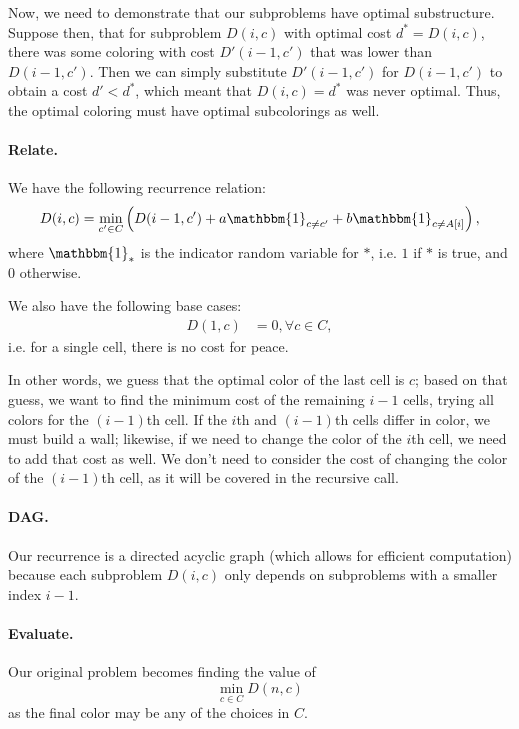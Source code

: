 \documentclass{6046}
\begin{document}
Now, we need to demonstrate that our subproblems
have optimal substructure. Suppose then, that
for subproblem $D(i, c)$ with optimal cost
$d^* = D(i, c)$, there was some coloring
with cost $D'(i - 1, c')$ that was lower than
$D(i - 1, c')$. Then we can simply substitute
$D'(i - 1, c')$ for $D(i - 1, c')$ to obtain
a cost $d' < d^*$, which meant that
$D(i, c) = d^*$ was never optimal. Thus,
the optimal coloring must have optimal subcolorings
as well.

\vspace{-1em}
\paragraph{Relate.}
We have the following recurrence relation:
\[
    D(i, c) = \min_{c' \in C}
        \left(D(i - 1, c') +
        a \mathbbm{1}_{c \ne c'} + 
        b \mathbbm{1}_{c \ne A[i]}
        \right),
\]
where $\mathbbm{1}_{*}$ is the indicator random
variable for $*$, i.e. $1$ if $*$ is true,
and $0$ otherwise.

We also have the following base cases:
\begin{align*}
    D(1, c) & = 0, \forall c \in C,
\end{align*}
i.e. for a single cell, there is no cost for peace.

In other words, we guess that the optimal color of the
last cell is $c$; based on that guess, we want to
find the minimum cost of the remaining $i - 1$ cells,
trying all colors for the $(i - 1)$th cell. If the
$i$th and $(i - 1)$th cells differ in color, we must
build a wall; likewise, if we need to change the color
of the $i$th cell, we need to add that cost as well.
We don't need to consider the cost of changing the color
of the $(i - 1)$th cell, as it will be covered in the
recursive call.

\vspace{-1em}
\paragraph{DAG.}
Our recurrence is a directed acyclic graph (which
allows for efficient computation)
because each subproblem $D(i, c)$ only
depends on subproblems with a smaller index $i -1 $.

\vspace{-1em}
\paragraph{Evaluate.}
Our original problem becomes finding the value of
\[
    \min_{c \in C}D(n, c)
\]
as the final color may be any of the choices in $C$.
\end{document}
